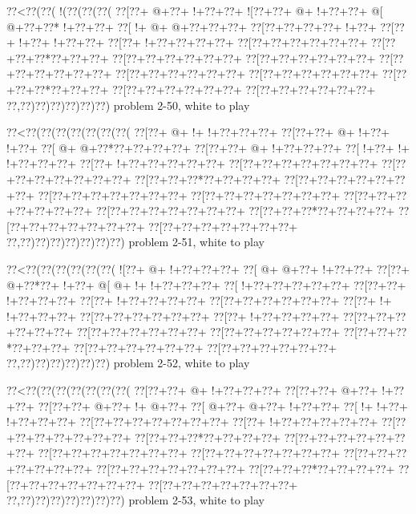 \vbox{\vbox{\goo
\0??<\0??(\0??(\- !(\0??(\0??(\0??(
\0??[\0??+\- @+\0??+\- !+\0??+\0??+
\- ![\0??+\0??+\- @+\- !+\0??+\0??+
\- @[\- @+\0??+\0??*\- !+\0??+\0??+
\0??[\- !+\- @+\- @+\0??+\0??+\0??+
\0??[\0??+\0??+\0??+\0??+\- !+\0??+
\0??[\0??+\- !+\0??+\- !+\0??+\0??+
\0??[\0??+\- !+\0??+\0??+\0??+\0??+
\0??[\0??+\0??+\0??+\0??+\0??+\0??+
\0??[\0??+\0??+\0??*\0??+\0??+\0??+
\0??[\0??+\0??+\0??+\0??+\0??+\0??+
\0??[\0??+\0??+\0??+\0??+\0??+\0??+
\0??[\0??+\0??+\0??+\0??+\0??+\0??+
\0??[\0??+\0??+\0??+\0??+\0??+\0??+
\0??[\0??+\0??+\0??+\0??+\0??+\0??+
\0??[\0??+\0??+\0??*\0??+\0??+\0??+
\0??[\0??+\0??+\0??+\0??+\0??+\0??+
\0??[\0??+\0??+\0??+\0??+\0??+\0??+
\0??,\0??)\0??)\0??)\0??)\0??)\0??)
}
\hfil problem 2-50, white to play\hfil\break
}

\vbox{\vbox{\goo
\0??<\0??(\0??(\0??(\0??(\0??(\0??(\0??(
\0??[\0??+\- @+\- !+\- !+\0??+\0??+\0??+
\0??[\0??+\0??+\- @+\- !+\0??+\- !+\0??+
\0??[\- @+\- @+\0??*\0??+\0??+\0??+\0??+
\0??[\0??+\0??+\- @+\- !+\0??+\0??+\0??+
\0??[\- !+\0??+\- !+\- !+\0??+\0??+\0??+
\0??[\0??+\- !+\0??+\0??+\0??+\0??+\0??+
\0??[\0??+\0??+\0??+\0??+\0??+\0??+\0??+
\0??[\0??+\0??+\0??+\0??+\0??+\0??+\0??+
\0??[\0??+\0??+\0??*\0??+\0??+\0??+\0??+
\0??[\0??+\0??+\0??+\0??+\0??+\0??+\0??+
\0??[\0??+\0??+\0??+\0??+\0??+\0??+\0??+
\0??[\0??+\0??+\0??+\0??+\0??+\0??+\0??+
\0??[\0??+\0??+\0??+\0??+\0??+\0??+\0??+
\0??[\0??+\0??+\0??+\0??+\0??+\0??+\0??+
\0??[\0??+\0??+\0??*\0??+\0??+\0??+\0??+
\0??[\0??+\0??+\0??+\0??+\0??+\0??+\0??+
\0??[\0??+\0??+\0??+\0??+\0??+\0??+\0??+
\0??,\0??)\0??)\0??)\0??)\0??)\0??)\0??)
}
\hfil problem 2-51, white to play\hfil\break
}

\vbox{\vbox{\goo
\0??<\0??(\0??(\0??(\0??(\0??(\0??(
\- ![\0??+\- @+\- !+\0??+\0??+\0??+
\0??[\- @+\- @+\0??+\- !+\0??+\0??+
\0??[\0??+\- @+\0??*\0??+\- !+\0??+
\- @[\- @+\- !+\- !+\0??+\0??+\0??+
\0??[\- !+\0??+\0??+\0??+\0??+\0??+
\0??[\0??+\0??+\- !+\0??+\0??+\0??+
\0??[\0??+\- !+\0??+\0??+\0??+\0??+
\0??[\0??+\0??+\0??+\0??+\0??+\0??+
\0??[\0??+\- !+\- !+\0??+\0??+\0??+
\0??[\0??+\0??+\0??+\0??+\0??+\0??+
\0??[\0??+\- !+\0??+\0??+\0??+\0??+
\0??[\0??+\0??+\0??+\0??+\0??+\0??+
\0??[\0??+\0??+\0??+\0??+\0??+\0??+
\0??[\0??+\0??+\0??+\0??+\0??+\0??+
\0??[\0??+\0??+\0??*\0??+\0??+\0??+
\0??[\0??+\0??+\0??+\0??+\0??+\0??+
\0??[\0??+\0??+\0??+\0??+\0??+\0??+
\0??,\0??)\0??)\0??)\0??)\0??)\0??)
}
\hfil problem 2-52, white to play\hfil\break
}

\vbox{\vbox{\goo
\0??<\0??(\0??(\0??(\0??(\0??(\0??(\0??(
\0??[\0??+\0??+\- @+\- !+\0??+\0??+\0??+
\0??[\0??+\0??+\- @+\0??+\- !+\0??+\0??+
\0??[\0??+\0??+\- @+\0??+\- !+\- @+\0??+
\0??[\- @+\0??+\- @+\0??+\- !+\0??+\0??+
\0??[\- !+\- !+\0??+\- !+\0??+\0??+\0??+
\0??[\0??+\0??+\0??+\0??+\0??+\0??+\0??+
\0??[\0??+\- !+\0??+\0??+\0??+\0??+\0??+
\0??[\0??+\0??+\0??+\0??+\0??+\0??+\0??+
\0??[\0??+\0??+\0??*\0??+\0??+\0??+\0??+
\0??[\0??+\0??+\0??+\0??+\0??+\0??+\0??+
\0??[\0??+\0??+\0??+\0??+\0??+\0??+\0??+
\0??[\0??+\0??+\0??+\0??+\0??+\0??+\0??+
\0??[\0??+\0??+\0??+\0??+\0??+\0??+\0??+
\0??[\0??+\0??+\0??+\0??+\0??+\0??+\0??+
\0??[\0??+\0??+\0??*\0??+\0??+\0??+\0??+
\0??[\0??+\0??+\0??+\0??+\0??+\0??+\0??+
\0??[\0??+\0??+\0??+\0??+\0??+\0??+\0??+
\0??,\0??)\0??)\0??)\0??)\0??)\0??)\0??)
}
\hfil problem 2-53, white to play\hfil\break
}

